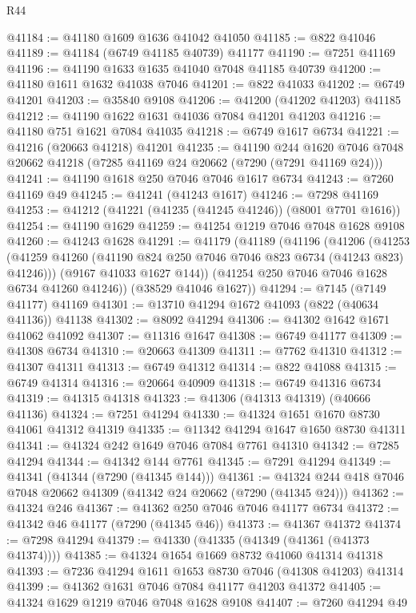 \begin{lexlean}{R44}
\begin{coremodule}
{@41184 := @41180 @1609 @1636 @41042 @41050
@41185 := @822 @41046
@41189 := @41184 (@6749 @41185 @40739) @41177
@41190 := @7251 @41169
@41196 := @41190 @1633 @1635 @41040 @7048 @41185 @40739
@41200 := @41180 @1611 @1632 @41038 @7046
@41201 := @822 @41033
@41202 := @6749 @41201
@41203 := @35840 @9108
@41206 := @41200 (@41202 @41203) @41185
@41212 := @41190 @1622 @1631 @41036 @7084 @41201 @41203
@41216 := @41180 @751 @1621 @7084 @41035
@41218 := @6749 @1617 @6734
@41221 := @41216 (@20663 @41218) @41201
@41235 := @41190
    @244
    @1620
    @7046
    @7048
    @20662
    @41218
    (@7285 @41169 @24 @20662 (@7290 (@7291 @41169 @24)))
@41241 := @41190 @1618 @250 @7046 @7046 @1617 @6734
@41243 := @7260 @41169 @49
@41245 := @41241 (@41243 @1617)
@41246 := @7298 @41169
@41253 := @41212 (@41221 (@41235 (@41245 @41246)) (@8001 @7701 @1616))
@41254 := @41190 @1629
@41259 := @41254 @1219 @7046 @7048 @1628 @9108
@41260 := @41243 @1628
@41291 := @41179
    (@41189
      (@41196
        (@41206
          (@41253 (@41259 @41260 (@41190 @824 @250 @7046 @7046 @823 @6734 (@41243 @823) @41246)))
          (@9167 @41033 @1627 @144))
        (@41254 @250 @7046 @7046 @1628 @6734 @41260 @41246))
      (@38529 @41046 @1627))
@41294 := @7145 (@7149 @41177) @41169
@41301 := @13710 @41294 @1672 @41093 (@822 (@40634 @41136)) @41138
@41302 := @8092 @41294
@41306 := @41302 @1642 @1671 @41062 @41092
@41307 := @11316 @1647
@41308 := @6749 @41177
@41309 := @41308 @6734
@41310 := @20663 @41309
@41311 := @7762 @41310
@41312 := @41307 @41311
@41313 := @6749 @41312
@41314 := @822 @41088
@41315 := @6749 @41314
@41316 := @20664 @40909
@41318 := @6749 @41316 @6734
@41319 := @41315 @41318
@41323 := @41306 (@41313 @41319) (@40666 @41136)
@41324 := @7251 @41294
@41330 := @41324 @1651 @1670 @8730 @41061 @41312 @41319
@41335 := @11342 @41294 @1647 @1650 @8730 @41311
@41341 := @41324 @242 @1649 @7046 @7084 @7761 @41310
@41342 := @7285 @41294
@41344 := @41342 @144 @7761
@41345 := @7291 @41294
@41349 := @41341 (@41344 (@7290 (@41345 @144)))
@41361 := @41324 @244 @418 @7046 @7048 @20662 @41309 (@41342 @24 @20662 (@7290 (@41345 @24)))
@41362 := @41324 @246
@41367 := @41362 @250 @7046 @7046 @41177 @6734
@41372 := @41342 @46 @41177 (@7290 (@41345 @46))
@41373 := @41367 @41372
@41374 := @7298 @41294
@41379 := @41330 (@41335 (@41349 (@41361 (@41373 @41374))))
@41385 := @41324 @1654 @1669 @8732 @41060 @41314 @41318
@41393 := @7236 @41294 @1611 @1653 @8730 @7046 (@41308 @41203) @41314
@41399 := @41362 @1631 @7046 @7084 @41177 @41203 @41372
@41405 := @41324 @1629 @1219 @7046 @7048 @1628 @9108
@41407 := @7260 @41294 @49
}
\end{coremodule}
\end{lexlean}
